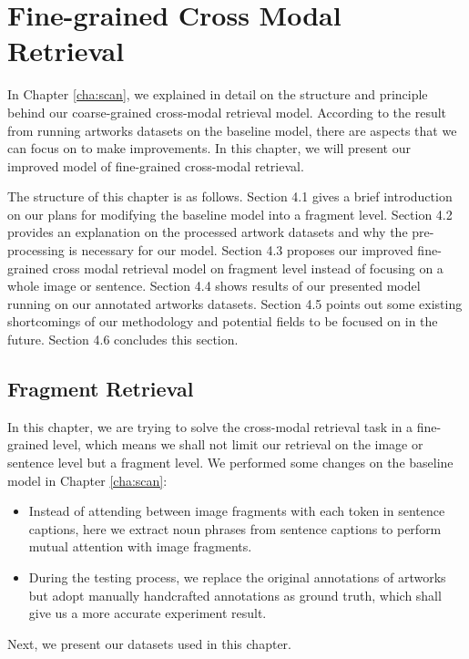 \chapter{Fine-grained Cross Modal Retrieval}
\label{cha:Method}

In Chapter \ref{cha:scan}, we explained in detail on the structure and principle behind our coarse-grained cross-modal retrieval model. According to the result from running artworks datasets on the baseline model, there are aspects that we can focus on to make improvements. In this chapter, we will present our improved model of fine-grained cross-modal retrieval.

The structure of this chapter is as follows. Section 4.1 gives a brief introduction on our plans for modifying the baseline model into a fragment level. Section 4.2 provides an explanation on the processed artwork datasets and why the pre-processing is necessary for our model. Section 4.3 proposes our improved fine-grained cross modal retrieval model on fragment level instead of focusing on a whole image or sentence. Section 4.4 shows results of our presented model running on our annotated artworks datasets. Section 4.5 points out some existing shortcomings of our methodology and potential fields to be focused on in the future. Section 4.6 concludes this section.


\section{Fragment Retrieval}
In this chapter, we are trying to solve the cross-modal retrieval task in a fine-grained level, which means we shall not limit our retrieval on the image or sentence level but a fragment level. We performed some changes on the baseline model in Chapter \ref{cha:scan}:

\begin{itemize}
    \item Instead of attending between image fragments with each token in sentence captions, here we extract noun phrases from sentence captions to perform mutual attention with image fragments.
    \item During the testing process, we replace the original annotations of artworks but adopt manually handcrafted annotations as ground truth, which shall give us a more accurate experiment result.
\end{itemize}

Next, we present our datasets used in this chapter.

